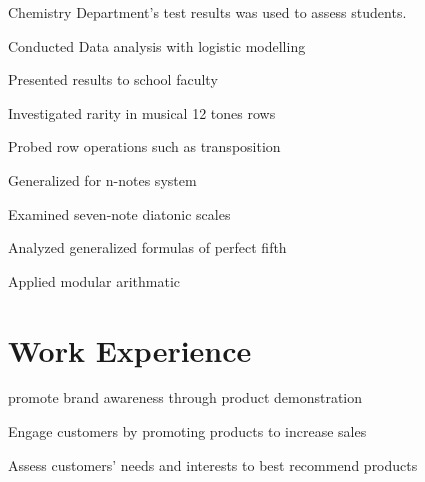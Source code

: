\begin{minipage}[t]{0.66\textwidth}
\begin{tightitemize}
\item Chemistry Department's test results was used to assess students.
\item Conducted Data analysis with logistic modelling
\item Presented results to school faculty
\end{tightitemize}


\begin{tightitemize}
\item Investigated rarity in musical 12 tones rows
\item Probed row operations such as transposition
\item Generalized for n-notes system
\end{tightitemize}
\sectionspace %


\begin{tightitemize}
\item Examined seven-note diatonic scales
\item Analyzed generalized formulas of perfect fifth
\item Applied modular arithmatic 
\end{tightitemize}
\sectionspace %


\section{Work Experience}

\begin{tightitemize}
\item promote brand awareness through product demonstration
\item Engage customers by promoting products to increase sales
\item Assess customers’ needs and interests to best recommend products
\end{tightitemize}


\end{minipage}
